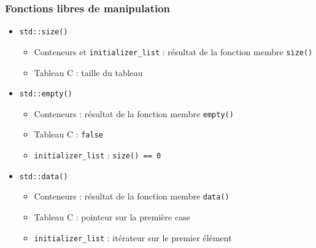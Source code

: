 \documentclass[C++.tex]{subfiles}
\begin{document}
\begin{frame}[fragile]
	\frametitle{Fonctions libres de manipulation}
	\begin{itemize}
		\item \lstinline|std::size()|
		\begin{itemize}
			\item Conteneurs et \lstinline|initializer_list| : résultat de la fonction membre \lstinline|size()|
			\item Tableau C : taille du tableau
		\end{itemize} 

		\item \lstinline|std::empty()|
		\begin{itemize}
			\item Conteneurs : résultat de la fonction membre \lstinline|empty()|
			\item Tableau C : \lstinline|false|
			\item \lstinline|initializer_list| : \lstinline|size() == 0|
		\end{itemize}

		\item \lstinline|std::data()|
		\begin{itemize}
			\item Conteneurs : résultat de la fonction membre \lstinline|data()|
			\item Tableau C : pointeur sur la première case
			\item \lstinline|initializer_list| : itérateur sur le premier élément
		\end{itemize}

	\end{itemize}	
\end{frame}
\end{document}
